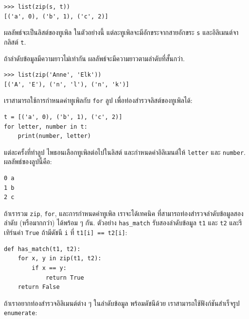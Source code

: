 \begin{verbatim}
>>> list(zip(s, t))
[('a', 0), ('b', 1), ('c', 2)]
\end{verbatim}
%
%
ผลลัพธ์จะเป็นลิสต์ของทูเพิล
ในตัวอย่างนี้ แต่ละทูเพิลจะมีอักขระจากสายอักขระ \texttt{s}
และอิลิเมนต์จากลิสต์ \texttt{t}.
%

%
ถ้าลำดับข้อมูลมีความยาวไม่เท่ากัน
ผลลัพธ์จะมีความยาวตามลำดับที่สั้นกว่า.


\begin{verbatim}
>>> list(zip('Anne', 'Elk'))
[('A', 'E'), ('n', 'l'), ('n', 'k')]
\end{verbatim}
%
%
เราสามารถใช้การกำหนดค่าทูเพิลกับ \texttt{for} ลูป เพื่อท่องสำรวจลิสต์ของทูเพิลได้:

\begin{verbatim}
t = [('a', 0), ('b', 1), ('c', 2)]
for letter, number in t:
    print(number, letter)
\end{verbatim}
%
%
แต่ละครั้งที่ทำลูป ไพธอนเลือกทูเพิลต่อไปในลิสต์
และกำหนดค่าอิลิเมนต์ให้ \texttt{letter} และ \texttt{number}.
ผลลัพธ์ของลูปนี้คือ:

\begin{verbatim}
0 a
1 b
2 c
\end{verbatim}
%
%
ถ้าเรารวม \texttt{zip}, \texttt{for}, และการกำหนดค่าทูเพิล
เราจะได้เทคนิค ที่สามารถท่องสำรวจลำดับข้อมูลสองลำดับ (หรือมากกว่า) ได้พร้อม ๆ กัน.
ตัวอย่าง \verb|has_match| รับสองลำดับข้อมูล \texttt{t1} และ \texttt{t2} และรีเทิร์นค่า \texttt{True} ถ้ามีดัชนี \texttt{i} 
ที่ \texttt{t1[i] == t2[i]}:
%

\begin{verbatim}
def has_match(t1, t2):
    for x, y in zip(t1, t2):
        if x == y:
            return True
    return False
\end{verbatim}
%
%
ถ้าเราอยากท่องสำรวจอิลิเมนต์ต่าง ๆ ในลำดับข้อมูล
พร้อมดัชนีด้วย
เราสามารถใช้ฟังก์ชันสำเร็จรูป \texttt{enumerate}:

